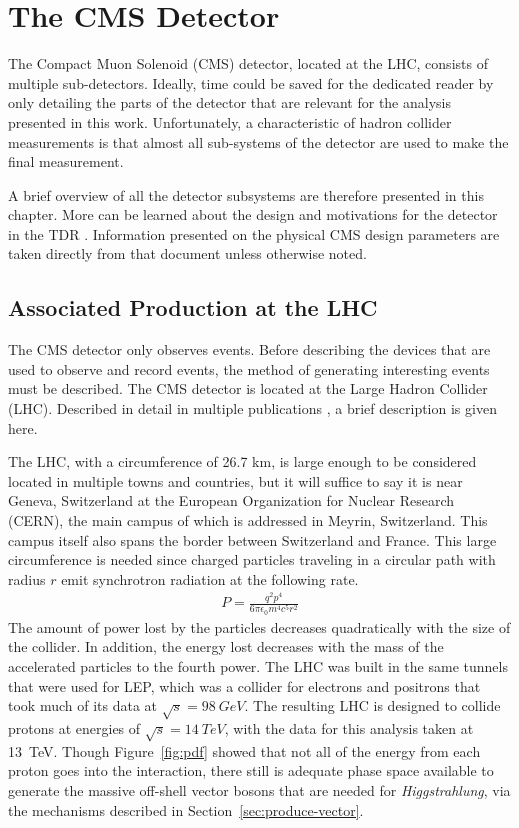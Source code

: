 \chapter{The CMS Detector} \label{ch:detector}

The Compact Muon Solenoid (CMS) detector, located at the LHC,
consists of multiple sub-detectors.
Ideally, time could be saved for the dedicated reader by only detailing
the parts of the detector that are relevant for the analysis presented in this work.
Unfortunately, a characteristic of hadron collider measurements is that
almost all sub-systems of the detector are used to make the final measurement.

A brief overview of all the detector subsystems are therefore presented in this chapter.
More can be learned about the design and motivations for the detector in the TDR \cite{cms-tdr}.
Information presented on the physical CMS design parameters are
taken directly from that document unless otherwise noted.

\section{Associated Production at the LHC}

The CMS detector only observes events.
Before describing the devices that are used to observe and record events,
the method of generating interesting events must be described.
The CMS detector is located at the Large Hadron Collider (LHC).
Described in detail in multiple publications \cite{Evans_2008},
a brief description is given here.

The LHC, with a circumference of 26.7 km,
is large enough to be considered located in multiple towns and countries,
but it will suffice to say it is near Geneva, Switzerland
at the European Organization for Nuclear Research (CERN),
the main campus of which is addressed in Meyrin, Switzerland.
This campus itself also spans the border between Switzerland and France.
This large circumference is needed since charged particles traveling
in a circular path with radius $r$ emit synchrotron radiation at the following rate.
\begin{gather}
  P = \frac{q^2 p^4}{6\pi \epsilon_0 m^4 c^5 r^2}
\end{gather}
The amount of power lost by the particles decreases quadratically
with the size of the collider.
In addition, the energy lost decreases with the mass of the accelerated particles
to the fourth power.
The LHC was built in the same tunnels that were used for LEP,
which was a collider for electrons and positrons that took much of its data at
$\sqrt{s} = \SI{98}{GeV}$.
The resulting LHC is designed to collide protons at energies of $\sqrt{s} = \SI{14}{TeV}$,
with the data for this analysis taken at \SI{13}{TeV}.
Though Figure~\ref{fig:pdf} showed that not all of the energy from each proton
goes into the interaction,
there still is adequate phase space available to generate the massive off-shell
vector bosons that are needed for \emph{Higgstrahlung},
via the mechanisms described in Section~\ref{sec:produce-vector}.

